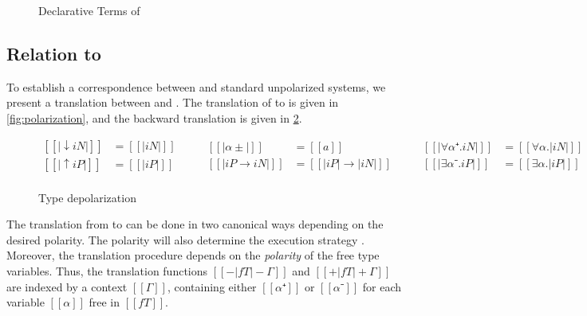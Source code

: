 \begin{figure}[h]
  \begin{multicols}{2}
    \ottgrammartabular{
      \ottc\ottinterrule
    }

    \ottgrammartabular{
      \ottv\ottinterrule
    }
  \end{multicols}
  \caption{Declarative Terms of \fexists}
  \label{fig:declarative-terms}
\end{figure}

\subsection{Relation to \systemf}

To establish a correspondence between \fexists and standard unpolarized systems,
we present a translation between \fexists and \systemf. The translation of
\systemf to \fexists is given in \cref{fig:polarization}, and the backward translation
is given in \cref{fig:depolarization}. 

\begin{figure}[h]
  \begin{equation*}
  \begin{aligned}
    [[|↓iN|]] &= [[|iN|]] \\
    [[|↑iP|]] &= [[|iP|]] \\
  \end{aligned}
  \qquad
  \begin{aligned}
    [[|α±|]] &= [[a]] \\
    [[|iP → iN|]] &= [[|iP| → |iN|]] \\
  \end{aligned}
  \qquad
  \begin{aligned}
    [[|∀α⁺.iN|]] &= [[∀α.|iN|]] \\
    [[|∃α⁻.iP|]] &= [[∃α.|iP|]] \\
  \end{aligned}
  \end{equation*}
  \caption{Type depolarization}
  \label{fig:depolarization}
\end{figure}

The translation from \systemf to \fexists can be done in two canonical ways
depending on the desired polarity. The polarity will also determine the 
execution strategy .
Moreover, the translation procedure depends on the \emph{polarity} of the
free type variables. Thus, the translation functions 
$[[-| fT |-Γ]]$ and $[[+| fT |+Γ]]$ are indexed by a context $[[Γ]]$, 
containing either $[[α⁺]]$ or $[[α⁻]]$ for each variable $[[α]]$ free in $[[fT]]$.

